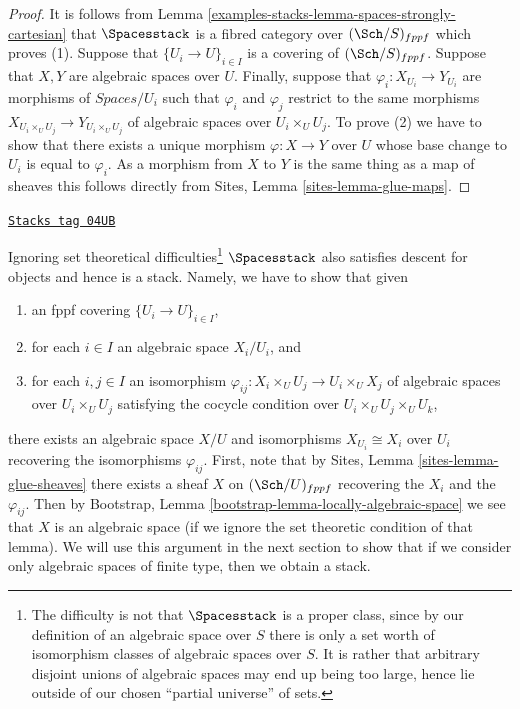 \begin{proof}
It is follows from
Lemma \ref{examples-stacks-lemma-spaces-strongly-cartesian}
that $\Spacesstack$ is a fibred category over $(\Sch/S)_{fppf}$
which proves (1).
Suppose that $\{U_i \to U\}_{i \in I}$ is a covering of
$(\Sch/S)_{fppf}$. Suppose that $X, Y$ are algebraic spaces over
$U$. Finally, suppose that $\varphi_i : X_{U_i} \to Y_{U_i}$ are morphisms
of $\textit{Spaces}/U_i$ such that $\varphi_i$ and $\varphi_j$ restrict
to the same morphisms $X_{U_i \times_U U_j} \to Y_{U_i \times_U U_j}$
of algebraic spaces over $U_i \times_U U_j$.
To prove (2) we have to show that there exists a unique morphism
$\varphi  : X \to Y$ over $U$ whose base change to $U_i$ is
equal to $\varphi_i$. As a morphism from $X$ to $Y$ is the same thing
as a map of sheaves this follows directly from
Sites, Lemma \ref{sites-lemma-glue-maps}.
\end{proof}

\begin{remark}
\label{examples-stacks-remark-stack-spaces}
\href{https://stacks.math.columbia.edu/tag/04UB}{\texttt{Stacks tag 04UB}}

Ignoring set theoretical difficulties\footnote{The difficulty is not
that $\Spacesstack$ is a proper class, since by our definition of
an algebraic space over $S$ there is only a set worth of isomorphism
classes of algebraic spaces over $S$. It is rather that arbitrary disjoint
unions of algebraic spaces may end up being too large, hence lie outside
of our chosen ``partial universe'' of sets.}
$\Spacesstack$ also satisfies
descent for objects and hence is a stack. Namely, we have to show that
given
\begin{enumerate}
\item an fppf covering $\{U_i \to U\}_{i \in I}$,
\item for each $i \in I$ an algebraic space $X_i/U_i$, and
\item for each $i, j \in I$ an isomorphism
$\varphi_{ij} : X_i \times_U U_j \to U_i \times_U X_j$ of algebraic spaces
over $U_i \times_U U_j$ satisfying the cocycle condition over
$U_i \times_U U_j \times_U U_k$,
\end{enumerate}
there exists an algebraic space $X/U$ and isomorphisms
$X_{U_i} \cong X_i$ over $U_i$ recovering the isomorphisms $\varphi_{ij}$.
First, note that by
Sites, Lemma \ref{sites-lemma-glue-sheaves}
there exists a sheaf $X$ on $(\Sch/U)_{fppf}$ recovering
the $X_i$ and the $\varphi_{ij}$. Then by
Bootstrap, Lemma \ref{bootstrap-lemma-locally-algebraic-space}
we see that $X$ is an algebraic space (if we ignore the set theoretic
condition of that lemma).
We will use this argument in the next section to show that
if we consider only algebraic spaces of finite type, then we obtain
a stack.
\end{remark}


